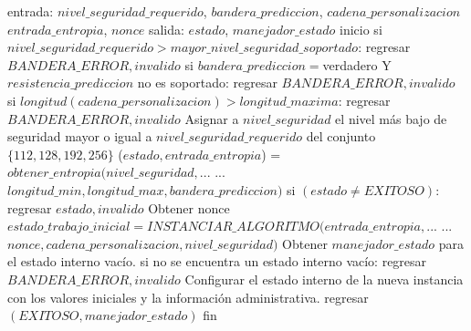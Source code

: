 \begin{description}
\begin{pseudocodigo}[caption={DRBG, instanciación.}, label={drbg:1}]
    entrada:  $nivel\_seguridad\_requerido$, $bandera\_prediccion$, $cadena\_personalizacion$
              $entrada\_entropia$, $nonce$
    salida:   $estado$, $manejador\_estado$
    inicio
      si $nivel\_seguridad\_requerido > mayor\_nivel\_seguridad\_soportado$:
        regresar $BANDERA\_ERROR, invalido$
      si $bandera\_prediccion = $verdadero Y $resistencia\_prediccion$ no es soportado:
        regresar $BANDERA\_ERROR, invalido$
      si $longitud(cadena\_personalizacion) > longitud\_maxima$:
        regresar $BANDERA\_ERROR, invalido$
      Asignar a $nivel\_seguridad$ el nivel más bajo de seguridad mayor o igual
        a $nivel\_seguridad\_requerido$ del conjunto $\{112, 128, 192, 256\}$
      ($estado, entrada\_entropia$) = $obtener\_entropia(nivel\_seguridad,$...
        ... $longitud\_min, longitud\_max, bandera\_prediccion)$
      si $(estado \neq EXITOSO)$:
        regresar $estado, invalido$
      Obtener nonce
      $estado\_trabajo\_inicial = INSTANCIAR\_ALGORITMO(entrada\_entropia,$...
        ... $nonce, cadena\_personalizacion, nivel\_seguridad)$
      Obtener $manejador\_estado$ para el estado interno vacío.
      si no se encuentra un estado interno vacío:
        regresar $BANDERA\_ERROR, invalido$
      Configurar el estado interno de la nueva instancia con los valores iniciales
        y la información administrativa.
      regresar $(EXITOSO, manejador\_estado)$
    fin
\end{pseudocodigo}


\end{description}
